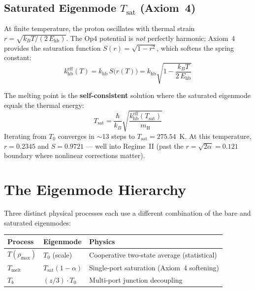 \subsection{Saturated Eigenmode $T_\mathrm{sat}$ (Axiom~4)}

At finite temperature, the proton oscillates with thermal strain $r = \sqrt{k_B T / (2\,E_\mathrm{hb})}$. The Op4 potential is \emph{not} perfectly harmonic; Axiom~4 provides the saturation function $S(r) = \sqrt{1 - r^2}$, which softens the spring constant:
\begin{equation}
    k_\mathrm{hb}^\mathrm{eff}(T) = k_\mathrm{hb} \, S\!\bigl(r(T)\bigr) = k_\mathrm{hb}\sqrt{1 - \frac{k_B T}{2\,E_\mathrm{hb}}}
\end{equation}

The melting point is the \textbf{self-consistent} solution where the saturated eigenmode equals the thermal energy:
\begin{equation}
    T_\mathrm{sat} = \frac{\hbar}{k_B}\sqrt{\frac{k_\mathrm{hb}^\mathrm{eff}(T_\mathrm{sat})}{m_\mathrm{H}}}
    \label{eq:self_consistent_sat}
\end{equation}
Iterating from $T_0$ converges in $\sim$13 steps to $T_\mathrm{sat} = 275.54$~K. At this temperature, $r = 0.2345$ and $S = 0.9721$ --- well into Regime~II (past the $r = \sqrt{2\alpha} = 0.121$ boundary where nonlinear corrections matter).


\section{The Eigenmode Hierarchy}

Three distinct physical processes each use a different combination of the bare and saturated eigenmodes:
\begin{center}
\renewcommand{\arraystretch}{1.3}
\begin{tabularx}{\textwidth}{@{}llX@{}}
\toprule
\textbf{Process} & \textbf{Eigenmode} & \textbf{Physics} \\
\midrule
$T(\rho_\mathrm{max})$ & $T_0$ (scale) & Cooperative two-state average (statistical) \\
$T_\mathrm{melt}$      & $T_\mathrm{sat}(1-\alpha)$ & Single-port saturation (Axiom~4 softening) \\
$T_b$                   & $(z/3) \cdot T_0$ & Multi-port junction decoupling \\
\bottomrule
\end{tabularx}
\end{center}

